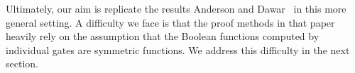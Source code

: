 \documentclass[../paper.tex]{subfiles}
\begin{document}
Ultimately, our aim is replicate the results Anderson and
Dawar~\cite{AndersonD17} in this more general setting.  A difficulty
we face is that the proof methods in that paper heavily rely on the
assumption that the Boolean functions computed by individual gates are
symmetric functions.  We address this difficulty in the next section.



\end{document}
